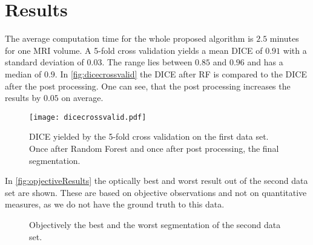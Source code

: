 \section{Results}
The average computation time for the whole proposed algorithm is $2.5$ minutes for one MRI volume. A 5-fold cross validation yields a mean DICE of $0.91$ with a standard deviation of $0.03$. The range lies between $0.85$ and $0.96$ and has a median of $0.9$. In \autoref{fig:dicecrossvalid} the DICE after RF is compared to the DICE after the post processing. One can see, that the post processing increases the results by $0.05$ on average.
\begin{figure}[h]
\centering
\texttt{[image: dicecrossvalid.pdf]}
\caption{DICE yielded by the 5-fold cross validation on the first data set. Once after Random Forest and once after post processing, the final segmentation.}
\label{fig:dicecrossvalid}
\end{figure}

In \autoref{fig:opjectiveResults} the optically best and worst result out of the second data set are shown. These are based on objective observations and not on quantitative measures, as we do not have the ground truth to this data.
\begin{figure*}[!t]
	\centering
	\hfil
	
	\caption{Objectively the best and the worst segmentation of the second data set.}
	\label{fig:opjectiveResults}
\end{figure*}